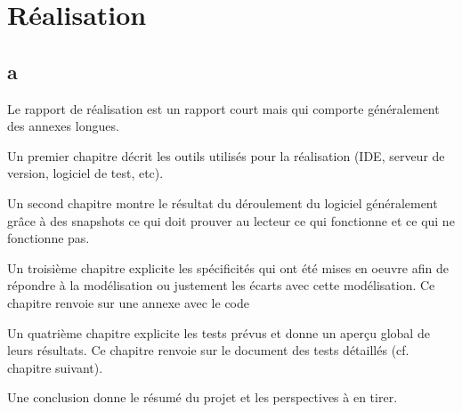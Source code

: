 	
	\part{Réalisation}
	
	\setcounter{chapter}{0} %
	\setcounter{section}{0} %
	
	\renewcommand*{\theHchapter}{\thepart.\thechapter}
	\chapter{a}
Le rapport de réalisation est un rapport court mais qui comporte généralement des annexes longues.

Un premier chapitre décrit les outils utilisés pour la réalisation (IDE, serveur de version, logiciel de test, etc).

Un second chapitre montre le résultat du déroulement du logiciel généralement grâce à des snapshots ce qui doit prouver au lecteur ce qui fonctionne et ce qui ne fonctionne pas.

Un troisième chapitre explicite les spécificités qui ont été mises en oeuvre afin de répondre à la modélisation ou justement les écarts avec cette modélisation. Ce chapitre renvoie sur une annexe avec le code

Un quatrième chapitre explicite les tests prévus et donne un aperçu global de leurs résultats. Ce chapitre renvoie sur le document des tests détaillés (cf. chapitre suivant).

Une conclusion donne le résumé du projet et les perspectives à en tirer.
